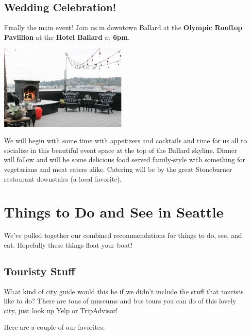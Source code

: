 \documentclass[10pt]{article}
\begin{document}
\subsection{Wedding Celebration!}
\label{subsec-wedding}
Finally the main event! Join us in downtown Ballard at the \textbf{Olympic Rooftop Pavillion} at
the \textbf{Hotel Ballard} at \textbf{6pm}.
\begin{center}
    \includegraphics[width=0.48\textwidth]{pavillion}
\end{center}

We will begin with some time with appetizers and cocktails and time for us all to socialize in this beautiful event space at the top of the Ballard skyline.
Dinner will follow and will be some delicious food served family-style with something for vegetarians and meat eaters alike. Catering will 
be by the great Stoneburner restaurant downstairs (a local favorite).

\newpage
\section{Things to Do and See in Seattle}
\label{sec-things-to-do}
We've pulled together our combined recommendations for things to do, see, and eat.
Hopefully these things float your boat!
\renewcommand\thesubsubsection{\arabic{subsubsection}}

\noindent\hrulefill

\subsection{Touristy Stuff}
What kind of city guide would this be if we didn't include the stuff that tourists like 
to do? There are tons of museums and bus tours you can do of this lovely city, just look up Yelp 
or TripAdvisor!

Here are a couple of our favorites:
\end{document}
